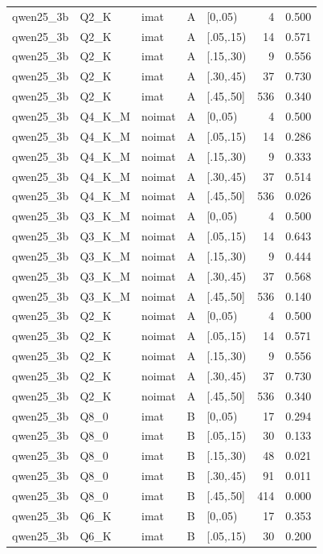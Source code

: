 \begin{tabular}{lllllrr}
qwen25\_3b & Q2\_K & imat & A & [0,.05) & 4 & 0.500 \\
qwen25\_3b & Q2\_K & imat & A & [.05,.15) & 14 & 0.571 \\
qwen25\_3b & Q2\_K & imat & A & [.15,.30) & 9 & 0.556 \\
qwen25\_3b & Q2\_K & imat & A & [.30,.45) & 37 & 0.730 \\
qwen25\_3b & Q2\_K & imat & A & [.45,.50] & 536 & 0.340 \\
qwen25\_3b & Q4\_K\_M & noimat & A & [0,.05) & 4 & 0.500 \\
qwen25\_3b & Q4\_K\_M & noimat & A & [.05,.15) & 14 & 0.286 \\
qwen25\_3b & Q4\_K\_M & noimat & A & [.15,.30) & 9 & 0.333 \\
qwen25\_3b & Q4\_K\_M & noimat & A & [.30,.45) & 37 & 0.514 \\
qwen25\_3b & Q4\_K\_M & noimat & A & [.45,.50] & 536 & 0.026 \\
qwen25\_3b & Q3\_K\_M & noimat & A & [0,.05) & 4 & 0.500 \\
qwen25\_3b & Q3\_K\_M & noimat & A & [.05,.15) & 14 & 0.643 \\
qwen25\_3b & Q3\_K\_M & noimat & A & [.15,.30) & 9 & 0.444 \\
qwen25\_3b & Q3\_K\_M & noimat & A & [.30,.45) & 37 & 0.568 \\
qwen25\_3b & Q3\_K\_M & noimat & A & [.45,.50] & 536 & 0.140 \\
qwen25\_3b & Q2\_K & noimat & A & [0,.05) & 4 & 0.500 \\
qwen25\_3b & Q2\_K & noimat & A & [.05,.15) & 14 & 0.571 \\
qwen25\_3b & Q2\_K & noimat & A & [.15,.30) & 9 & 0.556 \\
qwen25\_3b & Q2\_K & noimat & A & [.30,.45) & 37 & 0.730 \\
qwen25\_3b & Q2\_K & noimat & A & [.45,.50] & 536 & 0.340 \\
qwen25\_3b & Q8\_0 & imat & B & [0,.05) & 17 & 0.294 \\
qwen25\_3b & Q8\_0 & imat & B & [.05,.15) & 30 & 0.133 \\
qwen25\_3b & Q8\_0 & imat & B & [.15,.30) & 48 & 0.021 \\
qwen25\_3b & Q8\_0 & imat & B & [.30,.45) & 91 & 0.011 \\
qwen25\_3b & Q8\_0 & imat & B & [.45,.50] & 414 & 0.000 \\
qwen25\_3b & Q6\_K & imat & B & [0,.05) & 17 & 0.353 \\
qwen25\_3b & Q6\_K & imat & B & [.05,.15) & 30 & 0.200 \\

\end{tabular}
